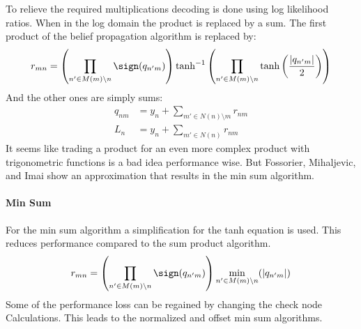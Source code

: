 To relieve the required multiplications decoding is done using log likelihood ratios. When in the log domain the product is replaced by a sum. The first product of the belief propagation algorithm is replaced by:
\begin{equation}
	r_{mn} = \left( \prod_{n' \in M(m)\setminus n}\sign(q_{n'm}) \right) \tanh^{-1}\left(\prod_{n' \in M(m) \setminus n}\tanh\left(\frac{\left|q_{n'm}\right|}{2}\right)\right)
\end{equation}
And the other ones are simply sums:
\begin{align}
	q_{nm} & = y_n + \sum_{m' \in N(n) \setminus m} r_{nm} \\
	L_n & = y_n + \sum_{m' \in N(n)} r_{nm}
\end{align}
It seems like trading a product for an even more complex product with trigonometric functions is a bad idea performance wise. But Fossorier, Mihaljevic, and Imai\cite{FoMi99} show an approximation that results in the min sum algorithm.

\paragraph{Min Sum}

For the min sum algorithm a simplification for the tanh equation is used. This reduces performance compared to the sum product algorithm.
\begin{equation}
	r_{mn} = \left( \prod_{n' \in M(m)\setminus n}\sign(q_{n'm}) \right) \min_{n' \in M(m) \setminus n}(\left|q_{n'm}\right|)
\end{equation}
Some of the performance loss can be regained by changing the check node Calculations. This leads to the normalized and offset min sum algorithms.

